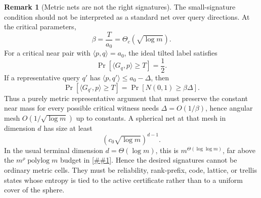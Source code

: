 \documentclass[10pt]{article}
\newcommand{\cref}[1]{\ref{##1}}
\theoremstyle{definition}
\newtheorem{remark}[theorem]{Remark}
\newcommand{\polylog}{\operatorname{polylog}}
\newcommand{\ip}[2]{\langle #1,#2\rangle}
\begin{document}
\begin{remark}[Metric nets are not the right signatures]
   \label{rem:metric-net-signature-barrier}
   The small-signature condition should not be interpreted as a standard net
   over query directions.  At the critical parameters,
   \[
      \beta=\frac{T}{a_0}=\Theta_c(\sqrt{\log m}).
   \]
   For a critical near pair with \(\ip{p}{q}=a_0\), the ideal tilted label
   satisfies
   \[
      \Pr[\ip{G_q}{p}\ge T]=\frac12.
   \]
   If a representative query \(q'\) has
   \(\ip{p}{q'}\le a_0-\Delta\), then
   \[
      \Pr[\ip{G_{q'}}{p}\ge T]
      =
      \Pr[N(0,1)\ge \beta\Delta].
   \]
   Thus a purely metric representative argument that must preserve the
   constant near mass for every possible critical witness needs
   \(\Delta=O(1/\beta)\), hence angular mesh \(O(1/\sqrt{\log m})\) up to
   constants.  A spherical net at that mesh in dimension \(d\) has size at
   least
   \[
      (c_0\sqrt{\log m})^{d-1}.
   \]
   In the usual terminal dimension \(d=\Theta(\log m)\), this is
   \(m^{\Theta(\log\log m)}\), far above the
   \(m^\rho\polylog m\) budget in
   \cref{cor:small-signature-gaussian-quadrature}.  Hence the desired
   signatures cannot be ordinary metric cells.  They must be reliability,
   rank-prefix, code, lattice, or trellis states whose entropy is tied to the
   active certificate rather than to a uniform cover of the sphere.
\end{remark}
\end{document}
